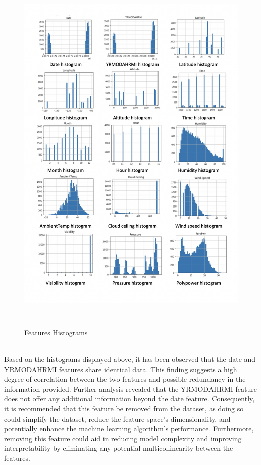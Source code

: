 \documentclass{report}
\begin{document}
\begin{figure}
    \centering
    \includegraphics[width=12cm, height=18cm]{123.png}
    \caption{Features Histograms}
\end{figure}\newpage \hfill \break 
\\
Based on the histograms displayed above, it has been observed that the date and YRMODAHRMI features share identical data. This finding suggests a high degree of correlation between the two features and possible redundancy in the information provided. Further analysis revealed that the YRMODAHRMI feature does not offer any additional information beyond the date feature. Consequently, it is recommended that this feature be removed from the dataset, as doing so could simplify the dataset, reduce the feature space's dimensionality, and potentially enhance the machine learning algorithm's performance. Furthermore, removing this feature could aid in reducing model complexity and improving interpretability by eliminating any potential multicollinearity between the features.
\end{document}
